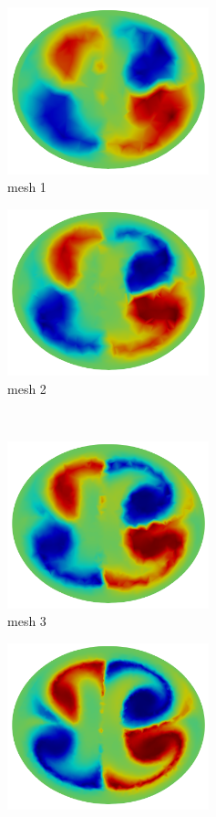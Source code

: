 \begin{figure}[htbp]
    \centering
    \begin{minipage}[c][2in][c]{0.4\linewidth}
        \centering
        \includegraphics[width=2.3in]{imgs/vena_cava/LNH_mesh1.png}\\
        mesh 1
    \end{minipage}
    \begin{minipage}[c][2in][c]{0.4\linewidth}
        \centering
        \includegraphics[width=2.3in]{imgs/vena_cava/LNH_mesh2.png}\\
        mesh 2
    \end{minipage}\\[.5\baselineskip]
    \begin{minipage}[c][2in][c]{0.4\linewidth}
        \centering
        \includegraphics[width=2.3in]{imgs/vena_cava/LNH_mesh3.png}\\
        mesh 3
    \end{minipage}
    \begin{minipage}[c][2in][c]{0.4\linewidth}
        \centering
        \includegraphics[width=2.3in]{imgs/vena_cava/LNH_mesh4.png}\\

\end{minipage}
\end{figure}
